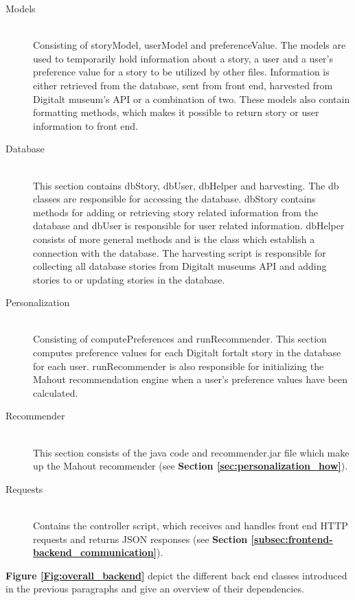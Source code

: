 \begin{description}
	\item[Models] \hfill \\
	Consisting of storyModel, userModel and preferenceValue. The models are used to temporarily hold information about a story, a user and a user’s preference value for a story to be utilized by other files. Information is either retrieved from the database, sent from front end, harvested from Digitalt museum’s API or a combination of two. These models also contain formatting methods, which makes it possible to return story or user information to front end.
	
	\item[Database] \hfill \\
	This section contains dbStory, dbUser, dbHelper and harvesting. The db classes are responsible for accessing the database. dbStory contains methods for adding or retrieving story related information from the database and dbUser is responsible for user related information. dbHelper consists of more general methods and is the class which establish a connection with the database. The harvesting script is responsible for collecting all database stories from Digitalt museums API and adding stories to or updating stories in the database. 

	\item[Personalization] \hfill \\
	Consisting of computePreferences and runRecommender. This section computes preference values for each Digitalt fortalt story in the database for each user. runRecommender is also responsible for initializing the Mahout recommendation engine when a user’s preference values have been calculated.
	
	\item[Recommender] \hfill \\
	This section consists of the java code and recommender.jar file which make up the Mahout recommender (see \textbf{Section \ref{sec:personalization_how}}).
	
	\item[Requests] \hfill \\
	Contains the controller script, which receives and handles front end HTTP requests and returns JSON responses (see \textbf{Section \ref{subsec:frontend-backend_communication}}).
	
\end{description}
	
\textbf{Figure \ref{Fig:overall_backend}} depict the different back end classes introduced in the previous paragraphs and give an overview of their dependencies.

